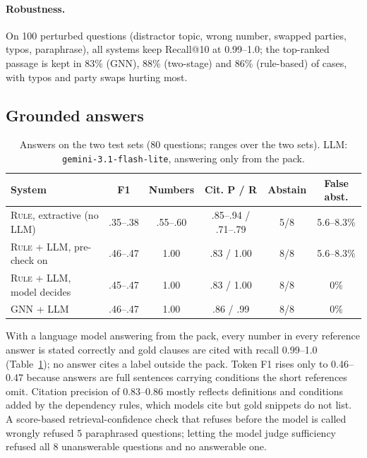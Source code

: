 \documentclass[11pt]{article}
\newcommand{\rulepipe}{\textsc{Rule}}
\begin{document}
\paragraph{Robustness.} On 100 perturbed questions (distractor topic, wrong number, swapped parties, typos, paraphrase), all systems keep Recall@10 at 0.99--1.0; the top-ranked passage is kept in 83\% (GNN), 88\% (two-stage) and 86\% (rule-based) of cases, with typos and party swaps hurting most.

\subsection{Grounded answers}
\label{sec:answers}

\begin{table}[t]
\centering
\scriptsize
\setlength{\tabcolsep}{2.5pt}
\begin{tabular}{@{}lccccc@{}}
\toprule
\textbf{System} & \textbf{F1} & \textbf{Numbers} & \textbf{Cit. P / R} & \textbf{Abstain} & \textbf{False abst.} \\
\midrule
\rulepipe{}, extractive (no LLM) & .35--.38 & .55--.60 & .85--.94 / .71--.79 & 5/8 & 5.6--8.3\% \\
\rulepipe{} + LLM, pre-check on & .46--.47 & 1.00 & .83 / 1.00 & 8/8 & 5.6--8.3\% \\
\rulepipe{} + LLM, model decides & .45--.47 & 1.00 & .83 / 1.00 & 8/8 & 0\% \\
GNN + LLM & .46--.47 & 1.00 & .86 / .99 & 8/8 & 0\% \\
\bottomrule
\end{tabular}
\caption{Answers on the two test sets (80 questions; ranges over the two sets). LLM: \texttt{gemini-3.1-flash-lite}, answering only from the pack.}
\label{tab:answers}
\end{table}

With a language model answering from the pack, every number in every reference answer is stated correctly and gold clauses are cited with recall 0.99--1.0 (Table~\ref{tab:answers}); no answer cites a label outside the pack. Token F1 rises only to 0.46--0.47 because answers are full sentences carrying conditions the short references omit. Citation precision of 0.83--0.86 mostly reflects definitions and conditions added by the dependency rules, which models cite but gold snippets do not list. A score-based retrieval-confidence check that refuses before the model is called wrongly refused 5 paraphrased questions; letting the model judge sufficiency refused all 8 unanswerable questions and no answerable one.
\end{document}
